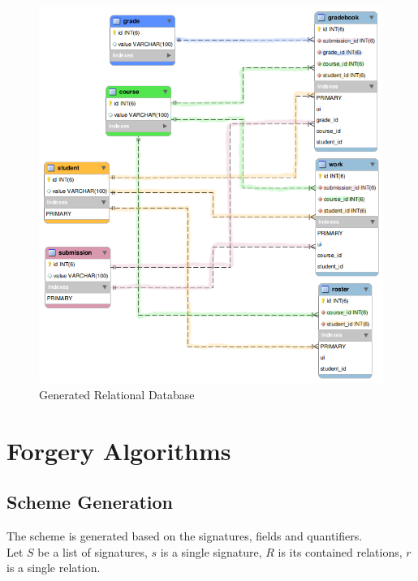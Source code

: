 \documentclass[oneside]{book}
\begin{document}
\begin{figure}[h!]
\centering
\includegraphics[scale=0.5]{3}
\caption{Generated Relational Database}
\end{figure}

\newpage

\section{Forgery Algorithms}
\label{sec:algorithm}

\subsection{Scheme Generation}

The scheme is generated based on the signatures, fields and quantifiers.\\

Let $S$ be a list of signatures, $s$ is a single signature, $R$ is its contained relations, $r$ is a single relation.\\
\end{document}
